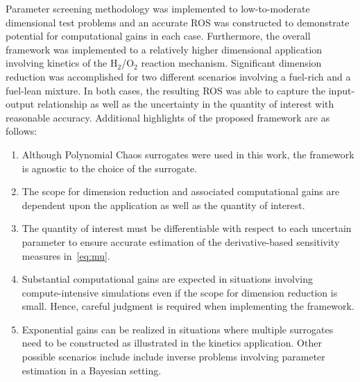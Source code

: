 Parameter screening methodology was implemented to low-to-moderate dimensional test problems
and an accurate ROS was constructed to demonstrate potential for computational gains in
each case. Furthermore, the overall framework was implemented  to a relatively higher 
dimensional application involving kinetics of the H$_2$/O$_2$ reaction mechanism. 
Significant dimension reduction was accomplished for two different scenarios involving
a fuel-rich and a fuel-lean mixture. In both cases, the resulting ROS was able to capture
the input-output relationship as well as the uncertainty in the quantity of interest with 
reasonable accuracy. Additional highlights of the proposed framework are as follows:

\begin{enumerate}
\item Although Polynomial Chaos surrogates were used in this work, the framework is
agnostic to the choice of the surrogate. 
\item The scope for dimension reduction and associated computational gains are
dependent upon the application as well as the quantity of interest. 
\item The quantity of interest must be differentiable with respect to each uncertain parameter
to ensure accurate estimation of the derivative-based sensitivity measures in~\eqref{eq:mu}.
\item Substantial computational gains are expected in situations involving compute-intensive
simulations even if the scope for dimension reduction is small. Hence, careful judgment 
is required when implementing the framework. 
\item Exponential gains can be realized in situations where multiple surrogates need to be
constructed as illustrated in the kinetics application. Other possible scenarios include
include inverse problems involving parameter estimation in a Bayesian setting. 
\end{enumerate}

